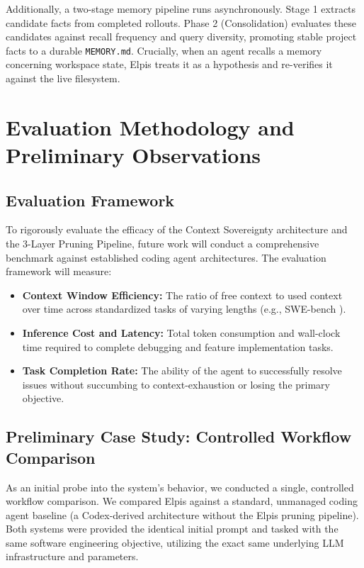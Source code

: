 \documentclass[conference]{IEEEtran}
\begin{document}
Additionally, a two-stage memory pipeline runs asynchronously. Stage 1 extracts candidate facts from completed rollouts. Phase 2 (Consolidation) evaluates these candidates against recall frequency and query diversity, promoting stable project facts to a durable \texttt{MEMORY.md}. Crucially, when an agent recalls a memory concerning workspace state, Elpis treats it as a hypothesis and re-verifies it against the live filesystem.

\section{Evaluation Methodology and Preliminary Observations}

\subsection{Evaluation Framework}
To rigorously evaluate the efficacy of the Context Sovereignty architecture and the 3-Layer Pruning Pipeline, future work will conduct a comprehensive benchmark against established coding agent architectures. The evaluation framework will measure:
\begin{itemize}
    \item \textbf{Context Window Efficiency:} The ratio of free context to used context over time across standardized tasks of varying lengths (e.g., SWE-bench \cite{jimenez2023swebench}).
    \item \textbf{Inference Cost and Latency:} Total token consumption and wall-clock time required to complete debugging and feature implementation tasks.
    \item \textbf{Task Completion Rate:} The ability of the agent to successfully resolve issues without succumbing to context-exhaustion or losing the primary objective.
\end{itemize}

\subsection{Preliminary Case Study: Controlled Workflow Comparison}
As an initial probe into the system's behavior, we conducted a single, controlled workflow comparison. We compared Elpis against a standard, unmanaged coding agent baseline (a Codex-derived architecture without the Elpis pruning pipeline). Both systems were provided the identical initial prompt and tasked with the same software engineering objective, utilizing the exact same underlying LLM infrastructure and parameters.
\end{document}
